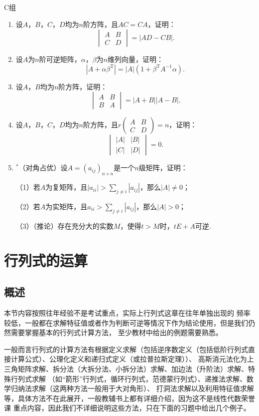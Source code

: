 \centerline{\heiti C组}
\begin{enumerate}
	\item 设$A$，$B$，$C$，$D$均为$n$阶方阵，且$AC=CA$，证明：
	$$\begin{vmatrix}
		A & B \\ C & D
	\end{vmatrix} = |AD-CB|.$$

	\item 设$A$为$n$阶可逆矩阵，$\alpha$，$\beta$为$n$维列向量，证明：
	$$|A+\alpha\beta^{\mathrm{T}}|=|A|(1+\beta^\mathrm{T}A^{-1}\alpha).$$
	\item 设$A$，$B$均为$n$阶方阵，证明：
	$$\begin{vmatrix}
		A & B \\ B & A
	\end{vmatrix} = |A+B||A-B|.$$
	\item 设$A$，$B$，$C$，$D$均为$n$阶方阵，且$r\begin{pmatrix}
		A & B \\ C & D
	\end{pmatrix}=n$，证明：
	$$\begin{vmatrix}
		|A| & |B| \\ |C| & |D|
	\end{vmatrix} = 0.$$
	\item $^*$（对角占优）设$A=(a_{ij})_{n \times n}$是一个$n$级矩阵，证明：
	
	（1）若$A$为复矩阵，且$|a_{ii}|>\sum_{j \neq i}|a_{ij}|$，那么$|A|\neq 0$；

	（2）若$A$为实矩阵，且$a_{ii}>\sum_{j \neq i}|a_{ij}|$，那么$|A|>0$；

	（3）（推论）存在充分大的实数$M$，使得$t>M$时，$tE+A$可逆.
\end{enumerate}

\section{行列式的运算}
\subsection{概述}
本节内容按照往年经验不是考试重点，实际上行列式这章在往年单独出现的
频率较低，一般都在求解特征值或者作为判断可逆等情况下作为结论使用，但是我们仍然需要掌握基本的行列式计算方法，
至少教材中给出的例题需要熟悉。

一般而言行列式的计算方法有根据定义求解（包括逆序数定义（包括低阶行列式直接计算公式）、公理化定义和递归式定义（或拉普拉斯定理））、
高斯消元法化为上三角矩阵求解、拆分法（大拆分法、小拆分法）求解、加边法（升阶法）求解、特殊行列式求解
（如“箭形”行列式，循环行列式，范德蒙行列式）、递推法求解、数学归纳法求解（这两种方法一般用于大对角形）、
打洞法求解以及利用特征值求解等，具体方法不在此展开，一般教辅书上都有详细介绍，因为这不是线性代数荣誉课
重点内容，因此我们不详细说明这些方法，只在下面的习题中给出几个例子。

